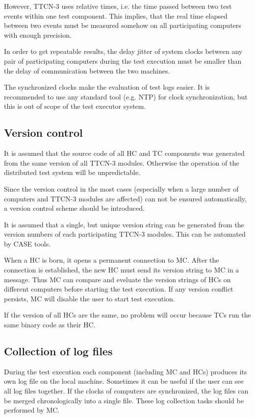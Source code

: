 \documentclass[a4paper,10pt]{article}
\begin{document}
However, TTCN-3 uses relative times, i.e. the time passed between two test events within one test component. This implies, that the real time elapsed between two events must be measured somehow on all participating computers with enough precision.

In order to get repeatable results, the delay jitter of system clocks between any pair of participating computers during the test execution must be smaller than the delay of communication between the two machines.

The synchronized clocks make the evaluation of test logs easier. It is recommended to use any standard tool (e.g. NTP) for clock synchronization, but this is out of scope of the test executor system.

\subsection{Version control}

It is assumed that the source code of all HC and TC components was generated from the same version of all TTCN-3 modules. Otherwise the operation of the distributed test system will be unpredictable.

Since the version control in the most cases (especially when a large number of computers and TTCN-3 modules are affected) can not be ensured automatically, a version control scheme should be introduced.

It is assumed that a single, but unique version string can be generated from the version numbers of each participating TTCN-3 modules. This can be automated by CASE tools.

When a HC is born, it opens a permanent connection to MC. After the connection is established, the new HC must send its version string to MC in a message. Thus MC can compare and eveluate the version strings of HCs on different computers before starting the test execution. If any version conflict persists, MC will disable the user to start test execution.

If the version of all HCs are the same, no problem will occur because TCs run the same binary code as their HC.

\subsection{Collection of log files}

During the test execution each component (including MC and HCs) produces its own log file on the local machine. Sometimes it can be useful if the user can see all log files together. If the clocks of computers are synchronized, the log files can be merged chronologically into a single file. These log collection tasks should be performed by MC.
\end{document}
